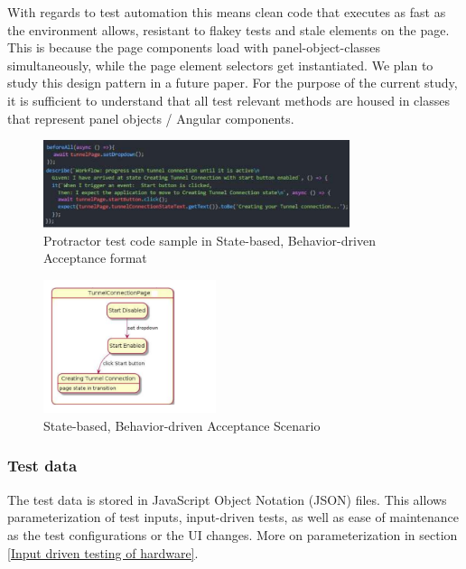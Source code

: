 \documentclass[conference]{IEEEtran}
\begin{document}
	With regards to test automation this means clean code that executes as fast as the environment allows, resistant to flakey tests \cite{fowler:flake} and stale elements on the page. 
	This is because the page components load with panel-object-classes simultaneously, while the page element selectors get instantiated.
	We plan to study this design pattern in a future paper. For the purpose of the current study, it is sufficient to understand that all test relevant methods are housed in classes that represent panel objects / Angular components.

	\begin{figure}[!h]
		\centering
			\includegraphics[width=0.80\textwidth]{codeSample.pdf}
		\caption{Protractor test code sample in State-based, Behavior-driven Acceptance format}
		\label{fig:codeSample}
	\end{figure}	

			
	\begin{figure}[!b]
		\centering
		\includegraphics[width=0.45\textwidth,]{stateBasedScenario.pdf}
		\caption{State-based, Behavior-driven Acceptance Scenario}
		\label{fig:stateBasedScenario}
	\end{figure}
	
	\subsubsection{Test data}
	The test data is stored in JavaScript Object Notation (JSON) files. 
	This allows parameterization of test inputs, input-driven tests, as well as ease of maintenance as the test configurations or the UI changes.
	More on parameterization in section \ref{Input driven testing of hardware}.
	
\end{document}
